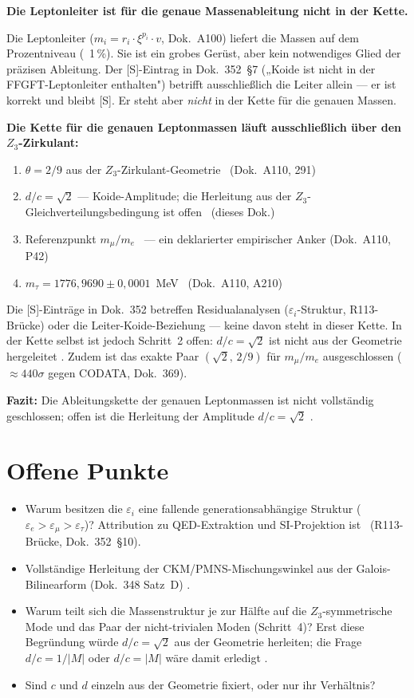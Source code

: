 \textbf{Die Leptonleiter ist für die genaue Massenableitung nicht in der Kette.}

Die Leptonleiter ($m_i = r_i\cdot\xi^{p_i}\cdot v$, Dok.~A100) liefert die
Massen auf dem Prozentniveau (~1\,\%). Sie ist ein grobes Gerüst, aber kein
notwendiges Glied der präzisen Ableitung. Der [S]-Eintrag in Dok.~352~\S7
(„Koide ist nicht in der FFGFT-Leptonleiter enthalten") betrifft ausschließlich
die Leiter allein --- er ist korrekt und bleibt [S]. Er steht aber \emph{nicht}
in der Kette für die genauen Massen.

\textbf{Die Kette für die genauen Leptonmassen läuft ausschließlich über den
$Z_3$-Zirkulant:}

\begin{enumerate}
  \item $\theta = 2/9$ aus der $Z_3$-Zirkulant-Geometrie \KM\ (Dok.~A110, 291)
  \item $d/c = \sqrt{2}$ --- Koide-Amplitude; die Herleitung aus der
        $Z_3$-Gleichverteilungsbedingung ist offen \SM\ (dieses Dok.)
  \item Referenzpunkt $m_\mu/m_e$ \QM\ --- ein deklarierter empirischer Anker
        (Dok.~A110, P42)
  \item $m_\tau = 1776{,}9690 \pm 0{,}0001$~MeV \KM\ (Dok.~A110, A210)
\end{enumerate}

Die [S]-Einträge in Dok.~352 betreffen Residualanalysen
($\varepsilon_i$-Struktur, R113-Brücke) oder die Leiter-Koide-Beziehung ---
keine davon steht in dieser Kette. In der Kette selbst ist jedoch Schritt~2
offen: $d/c = \sqrt{2}$ ist nicht aus der Geometrie hergeleitet \SM. Zudem ist
das exakte Paar $(\sqrt{2},\,2/9)$ für $m_\mu/m_e$ ausgeschlossen (${\approx}440\sigma$
gegen CODATA, Dok.~369).

\textbf{Fazit:} Die Ableitungskette der genauen Leptonmassen ist nicht
vollständig geschlossen; offen ist die Herleitung der Amplitude $d/c = \sqrt{2}$
\SM.

\section{Offene Punkte}

\begin{itemize}
  \item Warum besitzen die $\varepsilon_i$ eine fallende
    generationsabhängige Struktur ($\varepsilon_e > \varepsilon_\mu > \varepsilon_\tau$)?
    Attribution zu QED-Extraktion und SI-Projektion ist \SM\ (R113-Brücke, Dok.~352~\S10).
  \item Vollständige Herleitung der CKM/PMNS-Mischungswinkel aus der
    Galois-Bilinearform (Dok.~348 Satz~D) \SM.
  \item Warum teilt sich die Massenstruktur je zur Hälfte auf die
    $Z_3$-symmetrische Mode und das Paar der nicht-trivialen Moden (Schritt~4)?
    Erst diese Begründung würde $d/c = \sqrt{2}$ aus der Geometrie herleiten; die
    Frage $d/c = 1/|M|$ oder $d/c = |M|$ wäre damit erledigt \SM.
  \item Sind $c$ und $d$ einzeln aus der Geometrie fixiert, oder nur
    ihr Verhältnis? \SM
\end{itemize}

